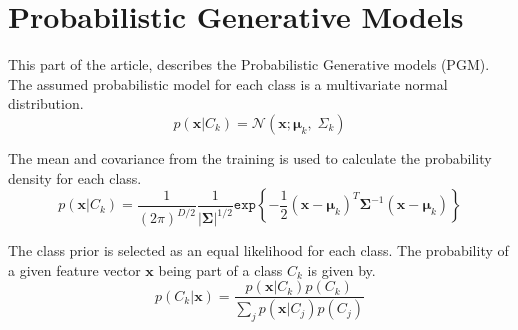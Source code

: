 \section*{Probabilistic Generative Models}
This part of the article, describes the Probabilistic Generative models (PGM).
The assumed probabilistic model for each class is a multivariate normal distribution. 
\begin{equation}
p(\mathbf{x}|C_k)=
\mathcal{N}(\mathbf{x};\mathbf{\mu}_k, \; \Sigma_k) 
\label{eq:gauss_dist} 
\end{equation}


The mean and covariance from the training is used to calculate the probability density for each class.
\begin{equation}
p(\mathbf{x}|C_k)=  
\dfrac{1}{(2\pi)^{D/2}} \dfrac{1}{\left|\mathbf{\Sigma} \right|^{1/2}} 
\mathtt{exp} \left\lbrace -\dfrac{1}{2} (\mathbf{x}-\mathbf{\mu}_k)^T \mathbf{\Sigma}^{-1} (\mathbf{x}-\mathbf{\mu}_k) \right\rbrace
\end{equation}

The class prior is selected as an equal likelihood for each class. The probability of a given feature vector $ \mathbf{x} $ being part of a class $ C_k $ is given by.
\begin{equation}
p(C_k |\mathbf{x}) =
\dfrac{p(\mathbf{x}|C_k) p(C_k)}
{\sum_j p(\mathbf{x}|C_j) p(C_j)}
\end{equation}